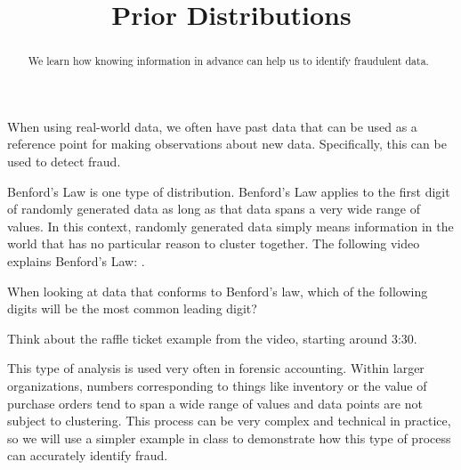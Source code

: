 \documentclass{ximera}
\title{Prior Distributions}
\begin{document}
\begin{abstract}
We learn how knowing information in advance can help us to identify fraudulent data.
\end{abstract}
\maketitle

When using real-world data, we often have past data that can be used as a reference point for making observations about new data. Specifically, this can be used to detect fraud.

Benford's Law is one type of distribution. Benford's Law applies to the first digit of randomly generated data as long as that data spans a very wide range of values. In this context, randomly generated data simply means information in the world that has no particular reason to cluster together. The following video explains Benford's Law: .

\begin{question}
When looking at data that conforms to Benford's law, which of the following digits will be the most common leading digit?
  \begin{solution}
    \begin{multiple-choice}
    \end{multiple-choice}
    \begin{hint}
      Think about the raffle ticket example from the video, starting around 3:30.
    \end{hint}
  \end{solution}
\end{question}

This type of analysis is used very often in forensic accounting. Within larger organizations, numbers corresponding to things like inventory or the value of purchase orders tend to span a wide range of values and data points are not subject to clustering. This process can be very complex and technical in practice, so we will use a simpler example in class to demonstrate how this type of process can accurately identify fraud.
\end{document}
